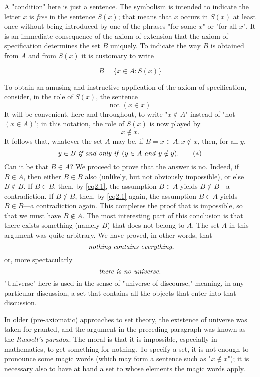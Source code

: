 A "condition" here is just a sentence. The symbolism is intended to indicate the letter $x$ is \textit{free} in the sentence $S(x)$; that means that $x$ occurs in $S(x)$ at least once without being introduced by one of the phrases "for some $x$" or "for all $x$". It is an immediate consequence of the axiom of extension that the axiom of specification determines the set $B$ uniquely. To indicate the way $B$ is obtained from $A$ and from $S(x)$ it is customary to write 

\begin{equation*}
B  = \{ x \in A: S(x) \} 
\end{equation*}

To obtain an amusing and instructive application of the axiom of specification, consider, in the role of $S(x)$, the sentence
\begin{equation*}
\text{not } (x \in x)
\end{equation*}
It will be convenient, here and throughout, to write "$x \notin  A$" instead of "not $(x \in A)$"; in this notation, the role of $S(x)$ is now played by
\begin{equation*}
x \notin x.
\end{equation*}
It follows that, whatever the set $A$ may be, if $B = {x \in A: x \notin x}$, then, for all $y$,
\begin{equation}
\label{eq2.1}
y \in B \text{ \textit{if and only if }} ( y \in A \text{ \textit{and} } y \notin y). \tag{$\ast$}
\end{equation}
Can it be that $B \in A$? We proceed to prove that the answer is no. Indeed, if $B \in A$, then either $B \in B$ also (unlikely, but not obviously impossible), or else $B \notin B$. If $B \in B$, then, by \eqref{eq2.1}, the assumption $B \in A$ yields $B \notin B$—a contradiction. If $B \notin B$, then, by \eqref{eq2.1} again, the assumption $B \in A$ yields $B \in B$—a contradiction again. This completes the proof that is impossible, so that we must have $B \notin A$. The most interesting part of this conclusion is that there exists something (namely $B$) that does not belong to $A$. The set $A$ in this argument was quite arbitrary. We have proved, in other words, that 
\begin{equation*}
\text{ \textit{nothing contains everything,}}
\end{equation*}
or, more spectacularly
\begin{equation*}
\text{\textit{there is no universe.}}
\end{equation*}
"Universe" here is used in the sense of "universe of discourse," meaning, in any particular discussion, a set that contains all the objects that enter into that discussion. 

In older (pre-axiomatic) approaches to set theory, the existence of universe was taken for granted, and the argument in the preceding paragraph was known as the \textit{Russell's paradox}. The moral is that it is impossible, especially in mathematics, to get something for nothing. To specify a set, it is not enough to pronounce some magic words (which may form a sentence such as "$x \notin x$"); it is necessary also to have at hand a set to whose elements the magic words apply. 